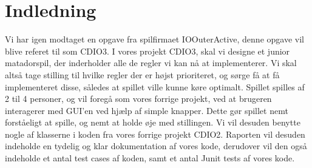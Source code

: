 \chapter{Indledning}
Vi har igen modtaget en opgave fra spilfirmaet IOOuterActive, denne opgave vil blive referet til som CDIO3.
I vores projekt CDIO3, skal vi designe et junior matadorspil, der inderholder alle de regler vi kan nå at implementerer. Vi skal altså tage stilling til hvilke regler der er højst prioriteret, og sørge få at få implementeret disse, således at spillet ville kunne køre optimalt. Spillet spilles af 2 til 4 personer, og vil foregå som vores forrige projekt, ved at brugeren interagerer med GUI'en ved hjælp af simple knapper. Dette gør spillet nemt forståeligt at spille, og nemt at holde øje med stillingen. Vi vil desuden benytte nogle af klasserne i koden fra vores forrige projekt CDIO2. Raporten vil desuden indeholde en tydelig og klar dokumentation af vores kode, derudover vil den også indeholde et antal test cases af koden, samt et antal Junit tests af vores kode.